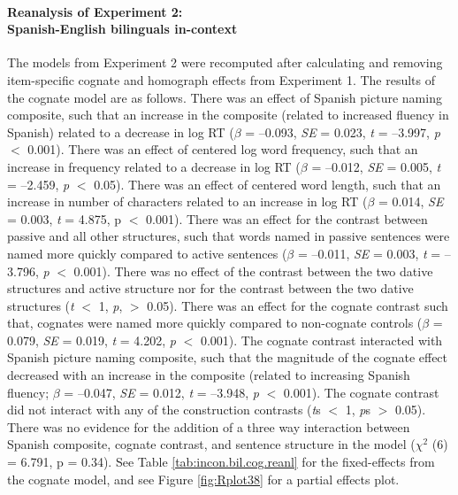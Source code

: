 \paragraph{Reanalysis of Experiment 2:\\ Spanish-English bilinguals in-context\\}
\label{reanalysisofexperiment2:spanish-englishbilingualsin-context}

The models from Experiment 2 were recomputed after calculating and removing item-specific cognate and homograph effects from Experiment 1. The results of the cognate model are as follows. There was an effect of Spanish picture naming composite, such that an increase in the composite (related to increased fluency in Spanish) related to a decrease in log RT (\emph{$\beta$} = --0.093, \emph{SE} = 0.023, \emph{t} = --3.997, \emph{p} $<$ 0.001). There was an effect of centered log word frequency, such that an increase in frequency related to a decrease in log RT (\emph{$\beta$} = --0.012, \emph{SE} = 0.005, \emph{t} = --2.459, \emph{p} $<$ 0.05). There was an effect of centered word length, such that an increase in number of characters related to an increase in log RT ($\beta$ = 0.014, \emph{SE} = 0.003, \emph{t} = 4.875, p $<$ 0.001). There was an effect for the contrast between passive and all other structures, such that words named in passive sentences were named more quickly compared to active sentences (\emph{$\beta$} = --0.011, \emph{SE} = 0.003, \emph{t} = --3.796, \emph{p} $<$ 0.001). There was no effect of the contrast between the two dative structures and active structure nor for the contrast between the two dative structures (\emph{t} $<$ 1, \emph{p}, $>$ 0.05). There was an effect for the cognate contrast such that, cognates were named more quickly compared to non-cognate controls (\emph{$\beta$} = 0.079, \emph{SE} = 0.019, \emph{t} = 4.202, \emph{p} $<$ 0.001). The cognate contrast interacted with Spanish picture naming composite, such that the magnitude of the cognate effect decreased with an increase in the composite (related to increasing Spanish fluency; \emph{$\beta$} = --0.047, \emph{SE} = 0.012, \emph{t} = --3.948, \emph{p} $<$ 0.001). The cognate contrast did not interact with any of the construction contrasts (\emph{t}s $<$ 1, \emph{p}s $>$ 0.05). There was no evidence for the addition of a three way interaction between Spanish composite, cognate contrast, and sentence structure in the model ($\chi^2$ (6) = 6.791, p = 0.34). See Table \ref{tab:incon.bil.cog.reanl} for the fixed-effects from the cognate model, and see Figure \ref{fig:Rplot38} for a partial effects plot. 


